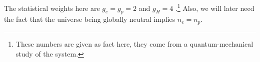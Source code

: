 \documentclass[main.tex]{subfiles}
\begin{document}
The statistical weights here are \(g_e = g_p = 2\) and \(g_H = 4\) \cite[pag.\ 194]{colespCosmology2002}.\footnote{These numbers are given as fact here, they come from a quantum-mechanical study of the system.}
Also, we will later need the fact that the universe being globally neutral implies \(n_e = n_p\). 



\end{document}
